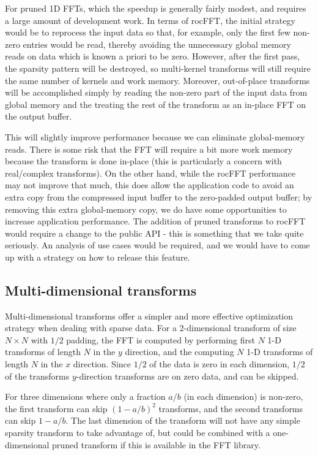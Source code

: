 \documentclass[12pt]{article}
\renewcommand{\(}{\left(}
\renewcommand{\)}{\right)}
\begin{document}
For pruned 1D FFTs, which the speedup is generally fairly modest, and
requires a large amount of development work.  In terms of rocFFT, the
initial strategy would be to reprocess the input data so that, for
example, only the first few non-zero entries would be read, thereby
avoiding the unnecessary global memory reads on data which is known a
priori to be zero.  However, after the first pass, the sparsity
pattern will be destroyed, so multi-kernel transforms will still
require the same number of kernels and work memory.  Moreover,
out-of-place transforms will be accomplished simply by reading the
non-zero part of the input data from global memory and the treating
the rest of the transform as an in-place FFT on the output buffer.

This will slightly improve performance because we can eliminate
global-memory reads.  There is some risk that the FFT will require a
bit more work memory because the transform is done in-place (this is
particularly a concern with real/complex transforms).  On the other
hand, while the rocFFT performance may not improve that much, this
does allow the application code to avoid an extra copy from the
compressed input buffer to the zero-padded output buffer; by removing
this extra global-memory copy, we do have some opportunities to
increase application performance.  The addition of pruned transforms
to rocFFT would require a change to the public API - this is something
that we take quite seriously.  An analysis of use cases would be
required, and we would have to come up with a strategy on how to
release this feature.

\subsection{Multi-dimensional transforms}

Multi-dimensional transforms offer a simpler and more effective
optimization strategy when dealing with sparse data.  For a
2-dimensional transform of size $N\times{}N$ with $1/2$ padding, the
FFT is computed by performing first $N$ 1-D transforms of length $N$
in the $y$ direction, and the computing $N$ 1-D transforms of length
$N$ in the $x$ direction.  Since $1/2$ of the data is zero in each
dimension, $1/2$ of the transforms $y$-direction transforms are on
zero data, and can be skipped.

For three dimensions where only a fraction $a/b$ (in each dimension)
is non-zero, the first transform can skip $(1- a/b)^2$ transforms, and
the second transforms can skip $1 - a/b$.  The last dimension of the
transform will not have any simple sparsity transform to take
advantage of, but could be combined with a one-dimensional pruned
transform if this is available in the FFT library.
\end{document}

